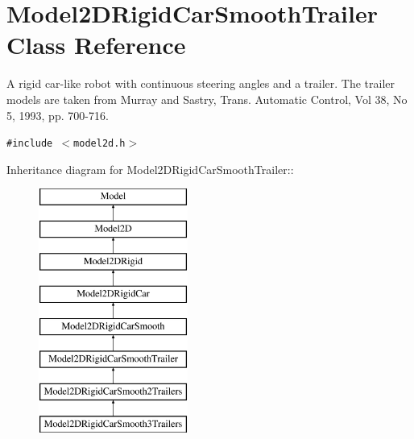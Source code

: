 \section{Model2DRigid\-Car\-Smooth\-Trailer  Class Reference}
\label{classModel2DRigidCarSmoothTrailer}
A rigid car-like robot with continuous steering angles and a trailer. The trailer models are taken from Murray and Sastry, Trans. Automatic Control, Vol 38, No 5, 1993, pp. 700-716. 


{\tt \#include $<$model2d.h$>$}

Inheritance diagram for Model2DRigid\-Car\-Smooth\-Trailer::\begin{figure}[H]
\begin{center}
\leavevmode
\includegraphics[height=8cm]{classModel2DRigidCarSmoothTrailer}
\end{center}
\end{figure}
